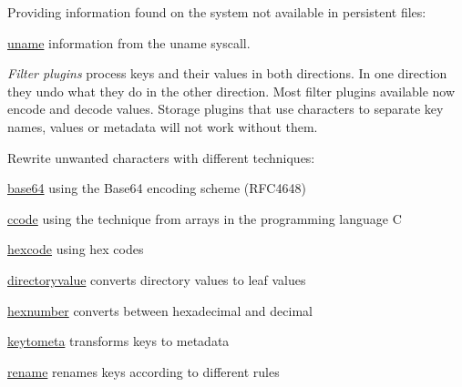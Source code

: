 Providing information found on the system not available in persistent files\+:


\begin{DoxyItemize}
\item \mbox{\hyperlink{autotoc_md702_src_plugins_uname_README_md}{uname}} information from the uname syscall.
\end{DoxyItemize}

{\itshape Filter plugins} process keys and their values in both directions. In one direction they undo what they do in the other direction. Most filter plugins available now encode and decode values. Storage plugins that use characters to separate key names, values or metadata will not work without them.

Rewrite unwanted characters with different techniques\+:


\begin{DoxyItemize}
\item \mbox{\hyperlink{autotoc_md52_src_plugins_base64_README_md}{base64}} using the Base64 encoding scheme (R\+F\+C4648)
\item \mbox{\hyperlink{autotoc_md78_src_plugins_ccode_README_md}{ccode}} using the technique from arrays in the programming language C
\item \mbox{\hyperlink{autotoc_md259_src_plugins_hexcode_README_md}{hexcode}} using hex codes
\end{DoxyItemize}


\begin{DoxyItemize}
\item \mbox{\hyperlink{autotoc_md181_src_plugins_directoryvalue_README_md}{directoryvalue}} converts directory values to leaf values
\item \mbox{\hyperlink{autotoc_md263_src_plugins_hexnumber_README_md}{hexnumber}} converts between hexadecimal and decimal
\item \mbox{\hyperlink{autotoc_md364_src_plugins_keytometa_README_md}{keytometa}} transforms keys to metadata
\item \mbox{\hyperlink{autotoc_md602_src_plugins_rename_README_md}{rename}} renames keys according to different rules
\end{DoxyItemize}


